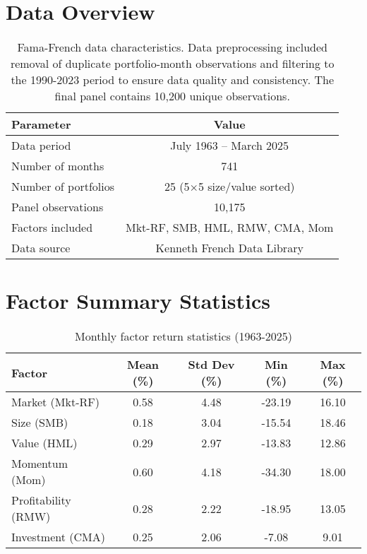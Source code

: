 \section*{Data Overview}
\begin{table}[H]
    \centering
    \caption{Fama-French data characteristics. Data preprocessing included removal of duplicate portfolio-month observations and filtering to the 1990-2023 period to ensure data quality and consistency. The final panel contains 10,200 unique observations.}
    \begin{tabular}{|l|c|}
        \hline
        \textbf{Parameter} & \textbf{Value} \\
        \hline
        Data period & July 1963 -- March 2025 \\
        Number of months & 741 \\
        Number of portfolios & 25 (5$\times$5 size/value sorted) \\
        Panel observations & 10,175 \\
        Factors included & Mkt-RF, SMB, HML, RMW, CMA, Mom \\
        Data source & Kenneth French Data Library\cite{FrenchData2024} \\
        \hline
    \end{tabular}
\end{table}

\section*{Factor Summary Statistics}
\begin{table}[H]
    \centering
    \caption{Monthly factor return statistics (1963-2025)}
    \begin{tabular}{|l|c|c|c|c|}
        \hline
        \textbf{Factor} & \textbf{Mean (\%)} & \textbf{Std Dev (\%)} & \textbf{Min (\%)} & \textbf{Max (\%)} \\
        \hline
        Market (Mkt-RF) & 0.58 & 4.48 & -23.19 & 16.10 \\
        Size (SMB)      & 0.18 & 3.04 & -15.54 & 18.46 \\
        Value (HML)     & 0.29 & 2.97 & -13.83 & 12.86 \\
        Momentum (Mom)  & 0.60 & 4.18 & -34.30 & 18.00 \\
        Profitability (RMW) & 0.28 & 2.22 & -18.95 & 13.05 \\
        Investment (CMA)    & 0.25 & 2.06 & -7.08  & 9.01 \\
        \hline
    \end{tabular}
\end{table}

